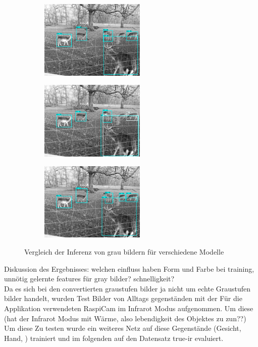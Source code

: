 \begin{figure}[htb]
    \centering
    \begin{subfigure}{5cm}
        \centering
        \includegraphics[width=5cm]{./Bilder/eval/rgb.png}
    \end{subfigure}
    \begin{subfigure}{5cm}
        \centering
        \includegraphics[width=5cm]{./Bilder/eval/gray_1ch.png}
    \end{subfigure}
    \begin{subfigure}{5cm}
        \centering
        \includegraphics[width=5cm]{./Bilder/eval/gray_3ch.png}
    \end{subfigure}
    \caption{Vergleich der Inferenz von grau bildern für verschiedene Modelle}
    \label{img:raspy_cam}
\end{figure}





Diskussion des Ergebnisses: welchen einfluss haben Form und Farbe 
bei training, unnötig gelernte features für gray bilder? schnelligkeit?
\\
Da es sich bei den convertierten graustufen bilder ja nicht um 
echte Graustufen bilder handelt, wurden Test Bilder von Alltags gegenständen 
mit der Für die Applikation verwendeten RaspiCam im Infrarot Modus aufgenommen. Um diese 
\\
(hat der Infrarot Modus mit Wärme, also lebendigkeit des Objektes zu zun??)
\\
Um diese Zu testen wurde ein weiteres Netz auf diese Gegenstände 
(Gesicht, Hand, ) trainiert und im folgenden auf 
den Datensatz true-ir evaluiert.

